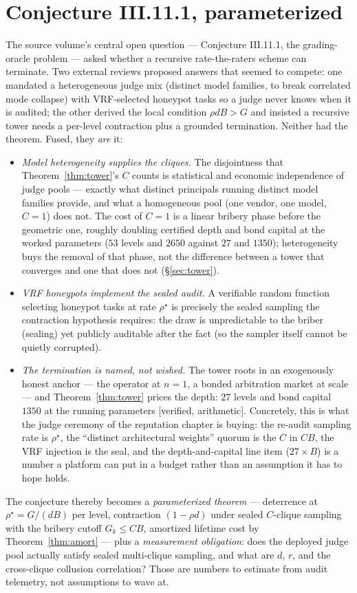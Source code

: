 \documentclass[11pt,a4paper]{article}
\begin{document}
\section{Conjecture III.11.1, parameterized}\label{sec:conjecture}
The source volume's central open question --- Conjecture III.11.1, the grading-oracle problem --- asked whether a recursive rate-the-raters scheme can terminate. Two external reviews proposed answers that seemed to compete: one mandated a heterogeneous judge mix (distinct model families, to break correlated mode collapse) with VRF-selected honeypot tasks so a judge never knows when it is audited; the other derived the local condition $\rho d B > G$ and insisted a recursive tower needs a per-level contraction plus a grounded termination. Neither had the theorem. Fused, they \emph{are} it:
\begin{itemize}[leftmargin=1.6em,itemsep=1pt]
\item \emph{Model heterogeneity supplies the cliques.} The disjointness that Theorem~\ref{thm:tower}'s $C$ counts is statistical and economic independence of judge pools --- exactly what distinct principals running distinct model families provide, and what a homogeneous pool (one vendor, one model, $C{=}1$) does not. The cost of $C{=}1$ is a linear bribery phase before the geometric one, roughly doubling certified depth and bond capital at the worked parameters ($53$ levels and $2650$ against $27$ and $1350$); heterogeneity buys the removal of that phase, not the difference between a tower that converges and one that does not (\S\ref{sec:tower}).
\item \emph{VRF honeypots implement the sealed audit.} A verifiable random function \cite{mrv1999} selecting honeypot tasks at rate $\rho^\star$ is precisely the sealed sampling the contraction hypothesis requires: the draw is unpredictable to the briber (sealing) yet publicly auditable after the fact (so the sampler itself cannot be quietly corrupted).
\item \emph{The termination is named, not wished.} The tower roots in an exogenously honest anchor --- the operator at $n{=}1$, a bonded arbitration market at scale --- and Theorem~\ref{thm:tower} prices the depth: $27$ levels and bond capital $1350$ at the running parameters [verified, arithmetic]. Concretely, this is what the judge ceremony of the reputation chapter is buying: the re-audit sampling rate is $\rho^\star$, the ``distinct architectural weights'' quorum is the $C$ in $CB$, the VRF injection is the seal, and the depth-and-capital line item ($27 \times B$) is a number a platform can put in a budget rather than an assumption it has to hope holds.
\end{itemize}
The conjecture thereby becomes a \emph{parameterized theorem} --- deterrence at $\rho^\star = G/(dB)$ per level, contraction $(1-\rho d)$ under sealed $C$-clique sampling with the bribery cutoff $G_k \le CB$, amortized lifetime cost by Theorem~\ref{thm:amort} --- plus a \emph{measurement obligation}: does the deployed judge pool actually satisfy sealed multi-clique sampling, and what are $d$, $r$, and the cross-clique collusion correlation? Those are numbers to estimate from audit telemetry, not assumptions to wave at.
\end{document}
